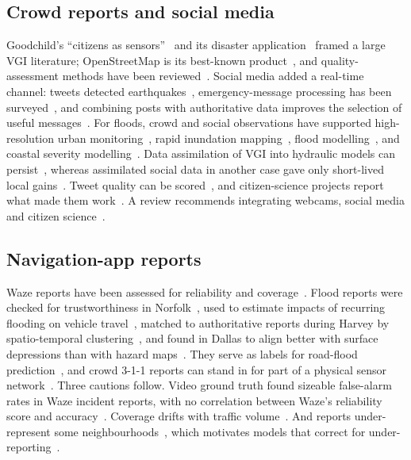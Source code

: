 \documentclass[journal]{IEEEtran}
\begin{document}
\subsection{Crowd reports and social media}
Goodchild's ``citizens as sensors''~\cite{goodchild2007citizens} and its disaster application~\cite{goodchild2010crowdsourcing} framed a large VGI literature; OpenStreetMap is its best-known product~\cite{haklay2008osm}, and quality-assessment methods have been reviewed~\cite{senaratne2017vgi}. Social media added a real-time channel: tweets detected earthquakes~\cite{sakaki2010earthquake}, emergency-message processing has been surveyed~\cite{imran2015social}, and combining posts with authoritative data improves the selection of useful messages~\cite{albuquerque2015geographic}. For floods, crowd and social observations have supported high-resolution urban monitoring~\cite{wang2018hyper}, rapid inundation mapping~\cite{rosser2017rapid,huang2018vgi,smith2017social}, flood modelling~\cite{assumpcao2018citizen}, and coastal severity modelling~\cite{sadler2018crowd}. Data assimilation of VGI into hydraulic models can persist~\cite{annis2019vgi}, whereas assimilated social data in another case gave only short-lived local gains~\cite{songchon2023assim}. Tweet quality can be scored~\cite{songchon2021quality}, and citizen-science projects report what made them work~\cite{lecoz2016citizen}. A review recommends integrating webcams, social media and citizen science~\cite{helmrich2021opportunities}.

\subsection{Navigation-app reports}
Waze reports have been assessed for reliability and coverage~\cite{aminnaseri2018waze}. Flood reports were checked for trustworthiness in Norfolk~\cite{praharaj2021waze}, used to estimate impacts of recurring flooding on vehicle travel~\cite{praharaj2021impacts}, matched to authoritative reports during Harvey by spatio-temporal clustering~\cite{lowrie2022waze}, and found in Dallas to align better with surface depressions than with hazard maps~\cite{safaei2023waze}. They serve as labels for road-flood prediction~\cite{yuan2023predicting,safaei2024hybrid,walker2024rfsi}, and crowd 3-1-1 reports can stand in for part of a physical sensor network~\cite{esparza2024crowd}. Three cautions follow. Video ground truth found sizeable false-alarm rates in Waze incident reports, with no correlation between Waze's reliability score and accuracy~\cite{goodall2019waze}. Coverage drifts with traffic volume~\cite{liu2023wazecoverage}. And reports under-represent some neighbourhoods~\cite{esparza2023imbalance,liu2024disparities}, which motivates models that correct for under-reporting~\cite{agostini2024underreport}.
\end{document}
